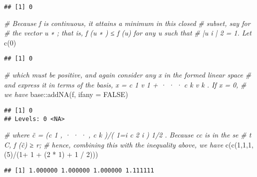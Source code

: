 \documentclass[
]{article}
\newenvironment{Shaded}{\begin{snugshade}}{\end{snugshade}}
\newcommand{\AttributeTok}[1]{\textcolor[rgb]{0.77,0.63,0.00}{#1}}
\newcommand{\CommentTok}[1]{\textcolor[rgb]{0.56,0.35,0.01}{\textit{#1}}}
\newcommand{\ConstantTok}[1]{\textcolor[rgb]{0.00,0.00,0.00}{#1}}
\newcommand{\DecValTok}[1]{\textcolor[rgb]{0.00,0.00,0.81}{#1}}
\newcommand{\FunctionTok}[1]{\textcolor[rgb]{0.00,0.00,0.00}{#1}}
\newcommand{\NormalTok}[1]{#1}
\newcommand{\SpecialCharTok}[1]{\textcolor[rgb]{0.00,0.00,0.00}{#1}}
\begin{document}
\begin{verbatim}
## [1] 0
\end{verbatim}

\begin{Shaded}
\begin{Highlighting}[]
\CommentTok{\# Because f is continuous, it attains a minimum in this closed}
\CommentTok{\# subset, say for}
\CommentTok{\# the vector u ∗ ; that is, f (u ∗ ) ≤ f (u) for any u such that}
\CommentTok{\# |u i | 2 = 1. Let}
\FunctionTok{c}\NormalTok{(}\DecValTok{0}\NormalTok{)}
\end{Highlighting}
\end{Shaded}

\begin{verbatim}
## [1] 0
\end{verbatim}

\begin{Shaded}
\begin{Highlighting}[]
\CommentTok{\# which must be positive, and again consider any x in the formed linear space}
\CommentTok{\# and express it in terms of the basis, x = c 1 v 1 + · · · c k v k . If x = 0, }
\CommentTok{\# we have}
\NormalTok{base}\SpecialCharTok{::}\FunctionTok{addNA}\NormalTok{(f, }\AttributeTok{ifany =} \ConstantTok{FALSE}\NormalTok{)}
\end{Highlighting}
\end{Shaded}

\begin{verbatim}
## [1] 0
## Levels: 0 <NA>
\end{verbatim}

\begin{Shaded}
\begin{Highlighting}[]
\CommentTok{\# where c̃ = (c 1 , · · · , c k )/( 1=i c 2 i ) 1/2 . Because cc is in the se}
\CommentTok{\# t C, f (c̃) ≥ r;}
\CommentTok{\# hence, combining this with the inequality above, we have}
\FunctionTok{c}\NormalTok{(}\FunctionTok{c}\NormalTok{(}\DecValTok{1}\NormalTok{,}\DecValTok{1}\NormalTok{,}\DecValTok{1}\NormalTok{,(}\DecValTok{5}\NormalTok{)}\SpecialCharTok{/}\NormalTok{(}\DecValTok{1}\SpecialCharTok{+} \DecValTok{1} \SpecialCharTok{+}\NormalTok{ (}\DecValTok{2} \SpecialCharTok{*} \DecValTok{1}\NormalTok{) }\SpecialCharTok{+} \DecValTok{1} \SpecialCharTok{/} \DecValTok{2}\NormalTok{)))}
\end{Highlighting}
\end{Shaded}

\begin{verbatim}
## [1] 1.000000 1.000000 1.000000 1.111111
\end{verbatim}
\end{document}
